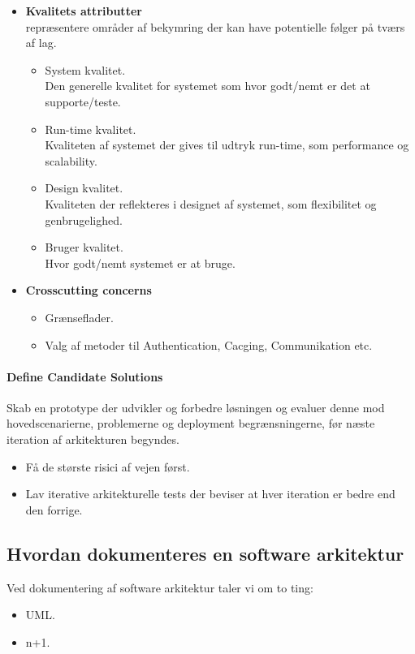 \begin{itemize}
	\item \textbf{Kvalitets attributter}\\
	repræsentere områder af bekymring der kan have potentielle følger på tværs af lag.
	\begin{itemize}
		\item System kvalitet.\\
		Den generelle kvalitet for systemet som hvor godt/nemt er det at supporte/teste.
		\item Run-time kvalitet.\\
		Kvaliteten af systemet der gives til udtryk run-time, som performance og scalability.
		\item Design kvalitet.\\
		Kvaliteten der reflekteres i designet af systemet, som flexibilitet og genbrugelighed.
		\item Bruger kvalitet.\\
		Hvor godt/nemt systemet er at bruge.
	\end{itemize}
	\item \textbf{Crosscutting concerns}
	\begin{itemize}
		\item Grænseflader.
		\item Valg af metoder til Authentication, Cacging, Communikation etc.
	\end{itemize}
\end{itemize}

\paragraph{Define Candidate Solutions}
Skab en prototype der udvikler og forbedre løsningen og evaluer denne mod hovedscenarierne, problemerne og deployment begrænsningerne, før næste iteration af arkitekturen begyndes.

\begin{itemize}
	\item Få de største risici af vejen først.
	\item Lav iterative arkitekturelle tests der beviser at hver iteration er bedre end den forrige.
\end{itemize}

\subsection{Hvordan dokumenteres en software arkitektur}
Ved dokumentering af software arkitektur taler vi om to ting:
\begin{itemize}
	\item UML.
	\item n+1.
\end{itemize}